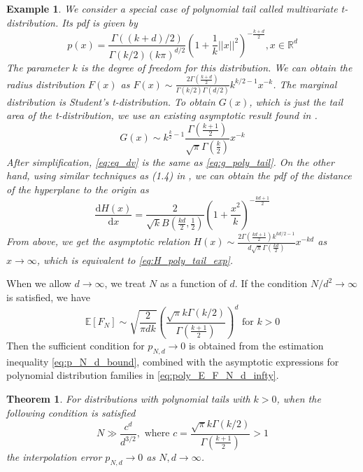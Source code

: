 \documentclass[conference,a4paper]{IEEEtran}
\def\E{\mathbb{E}}
\def\d{\mathrm{d}}
\newtheorem{example}{Example}
\newtheorem{theorem}{Theorem}
\begin{document}
\begin{example}
     We consider a special case of polynomial tail called multivariate t-distribution.
     Its pdf is given by
     \begin{equation}\label{eq:pxy_student_t}
          p(x) = \frac{\Gamma((k+d)/2)}{\Gamma(k/2)(k\pi)^{d/2}}
          \left(1+\frac{1}{k}||x||^2
          \right)^{-\frac{k+d}{2}}, x \in \mathbb{R}^d
      \end{equation}
      The parameter $k$ is the degree of freedom for this distribution.
      We can obtain the radius distribution
      $F(x)$ as $F(x) \sim \frac{2\Gamma(\frac{k+d}{2})}{\Gamma(k/2)\Gamma(d/2)} k^{k/2-1} x^{-k}$.
      The marginal distribution is Student's t-distribution. To obtain $G(x)$, which is just the tail area
of the t-distribution, we use an existing asymptotic result found in \cite{andrew1976}.
\begin{equation} \label{eq:eq_dv}
    G(x) \sim k^{\frac{k}{2}-1} \frac{\Gamma \left(\frac{k+1}{2} \right)}
    {\sqrt{\pi} \Gamma\left(\frac{k}{2}\right)}x^{-k}
\end{equation}
After simplification, \eqref{eq:eq_dv} is the same as \eqref{eq:g_poly_tail}.
On the other hand, using similar techniques as (1.4) in \cite{raynaud1970enveloppe},
we can obtain the pdf of the distance of the hyperplane to the origin as
\begin{equation}\label{eq:dH_dx_t_distribution}
     \frac{\d H(x)}{\d x} =  \frac{2}{\sqrt{k} B(\frac{kd}{2},\frac{1}{2})} \left(1 + \frac{x^2}{k} \right)^{-\frac{kd+1}{2}} 
\end{equation}
From above, we get the asymptotic relation $H(x) \sim \frac{2 \Gamma(\frac{kd+1}{2}) k^{kd/2-1}}{d\sqrt{\pi} \Gamma(\frac{kd}{2})}
x^{-kd}$ as $x\to \infty$, which is equivalent to \eqref{eq:H_poly_tail_exp}.

\end{example}
When we allow $d\to \infty$, we treat $N$ as a function of $d$.
If the condition $N/d^2 \to \infty$ is satisfied, we have
\begin{equation}\label{eq:poly_E_F_N_d_infty}
\E[F_N] \sim \sqrt{\frac{2}{\pi dk}}\left(
      \frac{\sqrt{\pi}k \Gamma(k/2)}
     {\Gamma(\frac{k+1}{2})}
 \right)^d \textrm{ for } k>0
\end{equation}
Then the sufficient condition for $p_{N,d} \to 0$ is obtained
from the estimation inequality \eqref{eq:p_N_d_bound},
combined with the asymptotic expressions for polynomial distribution families in \eqref{eq:poly_E_F_N_d_infty}.
\begin{theorem}
  For distributions with polynomial tails with $k>0$,
  when the following condition is satisfied
\begin{equation}
  N \gg \frac{c^d}{d^{3/2}}, \textrm{ where } c=\frac{\sqrt{\pi}k\Gamma(k/2)}{\Gamma(\frac{k+1}{2})}>1  
\end{equation}
the interpolation error $p_{N,d} \to 0$ as $N,d\to \infty$.
\end{theorem}
\end{document}
